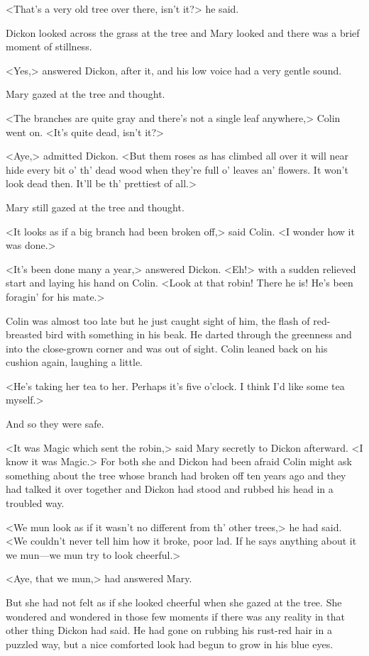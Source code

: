 <That's a very old tree over there, isn't it?> he said.

Dickon looked across the grass at the tree and Mary looked and there was a brief moment of stillness.

<Yes,> answered Dickon, after it, and his low voice had a very gentle sound.

Mary gazed at the tree and thought.

<The branches are quite gray and there's not a single leaf anywhere,> Colin went on. <It's quite dead, isn't it?>

<Aye,> admitted Dickon. <But them roses as has climbed all over it will near hide every bit o' th' dead wood when they're full o' leaves an' flowers. It won't look dead then. It'll be th' prettiest of all.>

Mary still gazed at the tree and thought.

<It looks as if a big branch had been broken off,> said Colin. <I wonder how it was done.>

<It's been done many a year,> answered Dickon. <Eh!> with a sudden relieved start and laying his hand on Colin. <Look at that robin! There he is! He's been foragin' for his mate.>

Colin was almost too late but he just caught sight of him, the flash of red-breasted bird with something in his beak. He darted through the greenness and into the close-grown corner and was out of sight. Colin leaned back on his cushion again, laughing a little.

<He's taking her tea to her. Perhaps it's five o'clock. I think I'd like some tea myself.>

And so they were safe.

<It was Magic which sent the robin,> said Mary secretly to Dickon afterward. <I know it was Magic.> For both she and Dickon had been afraid Colin might ask something about the tree whose branch had broken off ten years ago and they had talked it over together and Dickon had stood and rubbed his head in a troubled way.

<We mun look as if it wasn't no different from th' other trees,> he had said. <We couldn't never tell him how it broke, poor lad. If he says anything about it we mun—we mun try to look cheerful.>

<Aye, that we mun,> had answered Mary.

But she had not felt as if she looked cheerful when she gazed at the tree. She wondered and wondered in those few moments if there was any reality in that other thing Dickon had said. He had gone on rubbing his rust-red hair in a puzzled way, but a nice comforted look had begun to grow in his blue eyes.


